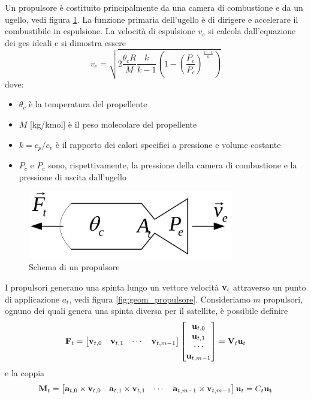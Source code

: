 Un propulsore è costituito principalmente da una camera di combustione e da un
ugello, vedi figura \ref{fig:propulsore}. La funzione primaria dell'ugello è di
dirigere e accelerare il combustibile in espulsione. La velocità di espulsione
$v_e$ si calcola dall'equazione dei ges ideali e si dimostra essere
\begin{equation}
v_e=\sqrt{2\frac{\theta_cR}{M}\frac{k}{k-1}\left(1-\left(\frac{P_e}{P_c}\right)^{\frac{k-1}{k}}\right)}
\end{equation}
dove:
\begin{itemize}
  \item $\theta_c$ è la temperatura del propellente
  \item $M$ [kg/kmol] è il peso molecolare del propellente
  \item $k=c_p/c_v$ è il rapporto dei calori specifici a pressione e volume
  costante
  \item $P_c$ e $P_e$ sono, rispettivamente, la pressione della camera di
  combustione e la pressione di uscita dall'ugello
\end{itemize}

\begin{figure}[htp]
\begin{center}
  \includegraphics[width=9cm]{modelling/attitude_kinematics_and_dynamics/image/propulsore.png}
  \caption{Schema di un propulsore}
  \label{fig:propulsore}
\end{center}
\end{figure}

I propulsori generano una spinta lungo un vettore velocità ${\bf v}_t$
attraverso un punto di applicazione $a_t$, vedi figura
\ref{fig:geom_propulsore}.
Consideriamo $m$ propulsori, ognuno dei quali genera una spinta diversa per il
satellite, è possibile definire
\begin{equation}
{\bf F}_t=\begin{bmatrix}
{\bf v}_{t,0} & {\bf v}_{t,1} & \dotsb & {\bf v}_{t,m-1}
\end{bmatrix} \begin{bmatrix}
{\bf u}_{t,0} \\ {\bf u}_{t,1} \\ \dotsb \\ {\bf u}_{t,m-1}
\end{bmatrix}={\bf V}_t{\bf u}_t
\label{eq:prop_forza}
\end{equation}
e la coppia
\begin{equation}
{\bf M}_t=\begin{bmatrix}
{\bf a}_{t,0}\times{\bf v}_{t,0} & {\bf a}_{t,1}\times{\bf v}_{t,1} &
\dotsb & {\bf a}_{t,m-1}\times{\bf v}_{t,m-1}
\end{bmatrix} {\bf u}_t= C_t {\bf u_t}
\end{equation}

